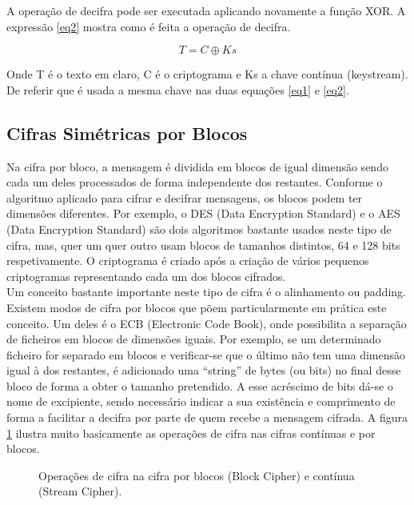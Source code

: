 \documentclass[a4paper,11pt,openright,oneside]{report}
\begin{document}
A operação de decifra pode ser executada aplicando novamente a função XOR. A expressão \ref{eq2} mostra como é feita a operação de decifra.

\begin{equation}
\label{eq2}
T = C \oplus Ks
\end{equation}

Onde T é o texto em claro, C é o criptograma e Ks a chave contínua (keystream).\\

De referir que é usada a mesma chave nas duas equações \ref{eq1} e \ref{eq2}.

\subsection{Cifras Simétricas por Blocos}

Na cifra por bloco, a mensagem é dividida em blocos de igual dimensão sendo cada um deles processados de forma independente dos restantes. Conforme o algoritmo aplicado para cifrar e decifrar mensagens, os blocos podem ter dimensões diferentes. Por exemplo, o DES (Data Encryption Standard) e o AES (Data Encryption Standard) são dois algoritmos bastante usados neste tipo de cifra, mas, quer um quer outro usam blocos de tamanhos distintos, 64 e 128 bits respetivamente. O criptograma é criado após a criação de vários pequenos criptogramas representando cada um dos blocos cifrados.\\

Um conceito bastante importante neste tipo de cifra é o alinhamento ou padding. Existem modos de cifra por blocos que põem particularmente em prática este conceito. Um deles é o ECB (Electronic Code Book), onde possibilita a separação de ficheiros em blocos de dimensões iguais. Por exemplo, se um determinado ficheiro for separado em blocos e verificar-se que o último não tem uma dimensão igual à dos restantes, é adicionado uma “string” de bytes (ou bits) no final desse bloco de forma a obter o tamanho pretendido. A esse acréscimo de bits dá-se o nome de excipiente, sendo necessário indicar a sua existência e comprimento de forma a facilitar a decifra por parte de quem recebe a mensagem cifrada. A figura \ref{fig:crypto2} ilustra muito basicamente as operações de cifra nas cifras contínuas e por blocos.

\begin{figure}[ht]
\center
{}
\caption{Operações de cifra na cifra por blocos (Block Cipher) e contínua (Stream Cipher).}
\label{fig:crypto2}
\end{figure}
\end{document}
